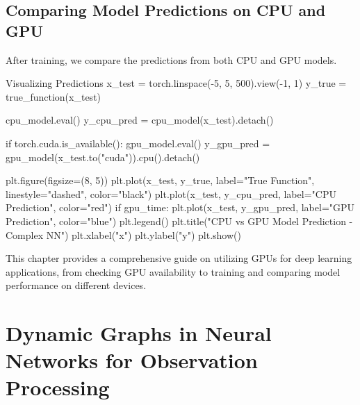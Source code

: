 \subsection{Comparing Model Predictions on CPU and GPU}
After training, we compare the predictions from both CPU and GPU models.

\begin{codeonly}{Visualizing Predictions}
x_test = torch.linspace(-5, 5, 500).view(-1, 1)
y_true = true_function(x_test)

cpu_model.eval()
y_cpu_pred = cpu_model(x_test).detach()

if torch.cuda.is_available():
    gpu_model.eval()
    y_gpu_pred = gpu_model(x_test.to("cuda")).cpu().detach()

plt.figure(figsize=(8, 5))
plt.plot(x_test, y_true, label="True Function", linestyle="dashed", color="black")
plt.plot(x_test, y_cpu_pred, label="CPU Prediction", color="red")
if gpu_time:
    plt.plot(x_test, y_gpu_pred, label="GPU Prediction", color="blue")
plt.legend()
plt.title("CPU vs GPU Model Prediction - Complex NN")
plt.xlabel("x")
plt.ylabel("y")
plt.show()
\end{codeonly}

This chapter provides a comprehensive guide on utilizing GPUs for deep learning applications, from checking GPU availability to training and comparing model performance on different devices.

% 
\section{Dynamic Graphs in Neural Networks for Observation Processing}
